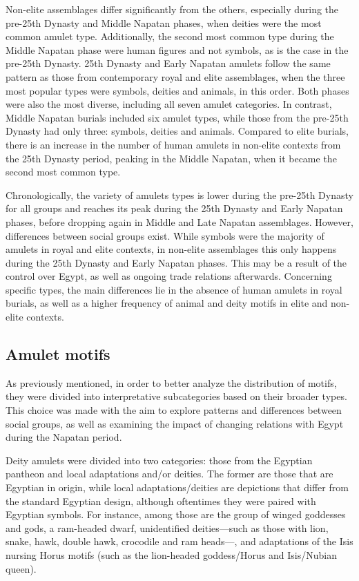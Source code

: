Non-elite assemblages differ significantly from the others, especially during the pre-25th Dynasty and Middle Napatan phases, when deities were the most common amulet type. Additionally, the second most common type during the Middle Napatan phase were human figures and not symbols, as is the case in the pre-25th Dynasty. 25th Dynasty and Early Napatan amulets follow the same pattern as those from contemporary royal and elite assemblages, when the three most popular types were symbols, deities and animals, in this order. Both phases were also the most diverse, including all seven amulet categories. In contrast, Middle Napatan burials included six amulet types, while those from the pre-25th Dynasty had only three: symbols, deities and animals. Compared to elite burials, there is an increase in the number of human amulets in non-elite contexts from the 25th Dynasty period, peaking in the Middle Napatan, when it became the second most common type.


Chronologically, the variety of amulets types is lower during the pre-25th Dynasty for all groups and reaches its peak during the 25th Dynasty and Early Napatan phases, before dropping again in Middle and Late Napatan assemblages. However, differences between social groups exist. While symbols were the majority of amulets in royal and elite contexts, in non-elite assemblages this only happens during the 25th Dynasty and Early Napatan phases. This may be a result of the control over Egypt, as well as ongoing trade relations afterwards. Concerning specific types, the main differences lie in the absence of human amulets in royal burials, as well as a higher frequency of animal and deity motifs in elite and non-elite contexts.


\subsection{Amulet motifs}


As previously mentioned, in order to better analyze the distribution of motifs, they were divided into interpretative subcategories based on their broader types. This choice was made with the aim to explore patterns and differences between social groups, as well as examining the impact of changing relations with Egypt during the Napatan period.


Deity amulets were divided into two categories: those from the Egyptian pantheon and local adaptations and/or deities. The former are those that are Egyptian in origin, while local adaptations/deities are depictions that differ from the standard Egyptian design, although oftentimes they were paired with Egyptian symbols. For instance, among those are the group of winged goddesses and gods, a ram-headed dwarf, unidentified deities---such as those with lion, snake, hawk, double hawk, crocodile and ram heads---, and adaptations of the Isis nursing Horus motifs (such as the lion-headed goddess/Horus and Isis/Nubian queen).


